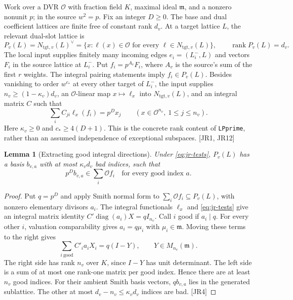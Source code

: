 \documentclass[11pt,a4paper]{article}
\numberwithin{equation}{section}
\newtheorem{lemma}[theorem]{Lemma}
\theoremstyle{remark}\newtheorem{remark}[theorem]{Remark}
\begin{document}
Work over a DVR $\mathcal O$ with fraction field $K$, maximal ideal $\mathfrak m$, and a nonzero nonunit $p$; in the source $w^2=p$. Fix an integer $D\ge0$. The base and dual coefficient lattices are finite free of constant rank $d_v$. At a target lattice $L$, the relevant dual-slot lattice is
\[
 P_v(L)=N_{\mathrm{tgt},v}(L)^\vee
   =\{x:\ell(x)\in\mathcal O\text{ for every }\ell\in N_{\mathrm{tgt},v}(L)\},
 \qquad \operatorname{rank}P_v(L)=d_v.
\]
The local input supplies finitely many incoming edges $e_i=(L_i^-,L)$ and vectors $F_i$ in the source lattice at $L_i^-$. Put $f_i=p^{A_v}F_i$, where $A_v$ is the source's sum of the first $r$ weights. The integral pairing statements imply $f_i\in P_v(L)$. Besides vanishing to order $w^{c_*}$ at every other target of $L_i^-$, the input supplies $n_v\ge(1-\kappa_v)d_v$, an $\mathcal O$-linear map $x\mapsto\ell_x$ into $N_{\mathrm{tgt},v}(L)$, and an integral matrix $C$ such that
\begin{equation}\label{eq:jr-tests}
 \sum_i C_{ji}\ell_x(f_i)=p^D x_j
 \qquad(x\in\mathcal O^{n_v},\ 1\le j\le n_v).
\end{equation}
Here $\kappa_v\ge0$ and $c_*\ge4(D+1)$. This is the concrete rank content of \texttt{LPprime}, rather than an assumed independence of exceptional subspaces. \textsf{[JR1, JR12]}

\begin{lemma}[Extracting good integral directions]\label{lem:jr-smith}
Under \eqref{eq:jr-tests}, $P_v(L)$ has a basis $b_{v,a}$ with at most $\kappa_vd_v$ bad indices, such that
\[
 p^D b_{v,a}\in\sum_i\mathcal O f_i
 \quad\text{for every good index }a.
\]
\end{lemma}
\begin{proof}
Put $q=p^D$ and apply Smith normal form to $\sum_i\mathcal O f_i\subseteq P_v(L)$, with nonzero elementary divisors $a_i$. The integral functionals $\ell_x$ and \eqref{eq:jr-tests} give an integral matrix identity $C'\operatorname{diag}(a_i)X=qI_{n_v}$. Call $i$ good if $a_i\mid q$. For every other $i$, valuation comparability gives $a_i=q\mu_i$ with $\mu_i\in\mathfrak m$. Moving these terms to the right gives
\[
 \sum_{i\ \mathrm{good}} C'_i a_i X_i=q(I-Y),
 \qquad Y\in M_{n_v}(\mathfrak m).
\]
The right side has rank $n_v$ over $K$, since $I-Y$ has unit determinant. The left side is a sum of at most one rank-one matrix per good index. Hence there are at least $n_v$ good indices. For their ambient Smith basis vectors, $q b_{v,a}$ lies in the generated sublattice. The other at most $d_v-n_v\le\kappa_vd_v$ indices are bad. \textsf{[JR4]}
\end{proof}
\end{document}
